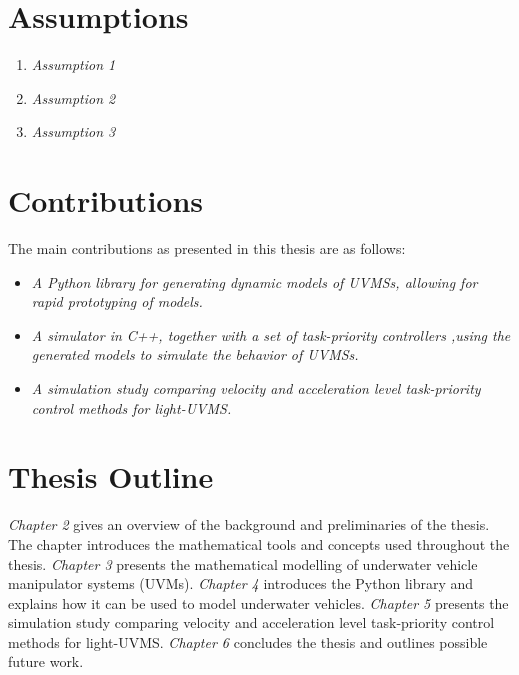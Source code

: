 
\section{Assumptions}
\begin{enumerate}
    \item \emph{Assumption 1}
    \item \emph{Assumption 2}
    \item \emph{Assumption 3}
\end{enumerate}

\section{Contributions}

The main contributions as presented in this thesis are as follows:
\begin{itemize}
    \item \emph{A Python library for generating dynamic models of UVMSs, allowing
        for rapid prototyping of models.}
    \item \emph{A simulator in C++, together with a set of task-priority controllers
        ,using the generated models to simulate the behavior of UVMSs.}
    \item \emph{A simulation study comparing velocity and acceleration level
        task-priority control methods for light-UVMS.}
\end{itemize}

\section{Thesis Outline}

\emph{Chapter 2} gives an overview of the background and preliminaries of the
thesis. The chapter introduces the mathematical tools and concepts used throughout
the thesis. \emph{Chapter 3} presents the mathematical modelling of underwater
vehicle manipulator systems (UVMs). \emph{Chapter 4} introduces the Python library
\pymuvs and explains how it can be used to model underwater vehicles. \emph{Chapter 5}
presents the simulation study comparing velocity and acceleration level task-priority
control methods for light-UVMS. \emph{Chapter 6} concludes the thesis and outlines
possible future work.
